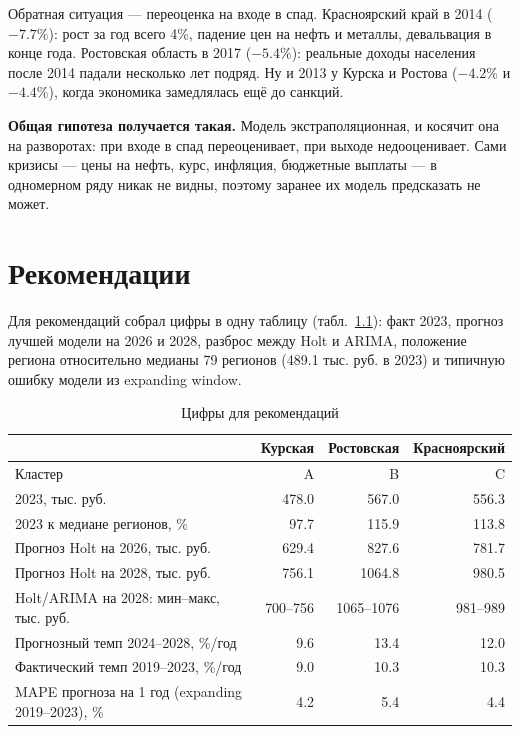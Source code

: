 \documentclass[12pt,a4paper]{report}
\begin{document}
Обратная ситуация --- переоценка на входе в спад. Красноярский край в 2014 ($-7.7\%$): рост за год всего 4\%, падение цен на нефть и металлы, девальвация в конце года. Ростовская область в 2017 ($-5.4\%$): реальные доходы населения после 2014 падали несколько лет подряд. Ну и 2013 у Курска и Ростова ($-4.2\%$ и $-4.4\%$), когда экономика замедлялась ещё до санкций.

\textbf{Общая гипотеза получается такая.} Модель экстраполяционная, и косячит она на разворотах: при входе в спад переоценивает, при выходе недооценивает. Сами кризисы --- цены на нефть, курс, инфляция, бюджетные выплаты --- в одномерном ряду никак не видны, поэтому заранее их модель предсказать не может.

\chapter{Рекомендации}

Для рекомендаций собрал цифры в одну таблицу (табл.~\ref{tab:rec}): факт 2023, прогноз лучшей модели на 2026 и 2028, разброс между Holt и ARIMA, положение региона относительно медианы 79 регионов (489.1 тыс. руб. в 2023) и типичную ошибку модели из expanding window.

\begin{table}[H]
\centering
\caption{Цифры для рекомендаций}
\label{tab:rec}
\small
\begin{tabular}{lrrr}
\toprule
 & Курская & Ростовская & Красноярский \\
\midrule
Кластер & A & B & C \\
2023, тыс. руб. & 478.0 & 567.0 & 556.3 \\
2023 к медиане регионов, \% & 97.7 & 115.9 & 113.8 \\
Прогноз Holt на 2026, тыс. руб. & 629.4 & 827.6 & 781.7 \\
Прогноз Holt на 2028, тыс. руб. & 756.1 & 1064.8 & 980.5 \\
Holt/ARIMA на 2028: мин--макс, тыс. руб. & 700--756 & 1065--1076 & 981--989 \\
Прогнозный темп 2024--2028, \%/год & 9.6 & 13.4 & 12.0 \\
Фактический темп 2019--2023, \%/год & 9.0 & 10.3 & 10.3 \\
MAPE прогноза на 1 год (expanding 2019--2023), \% & 4.2 & 5.4 & 4.4 \\
\bottomrule
\end{tabular}
\end{table}
\end{document}
